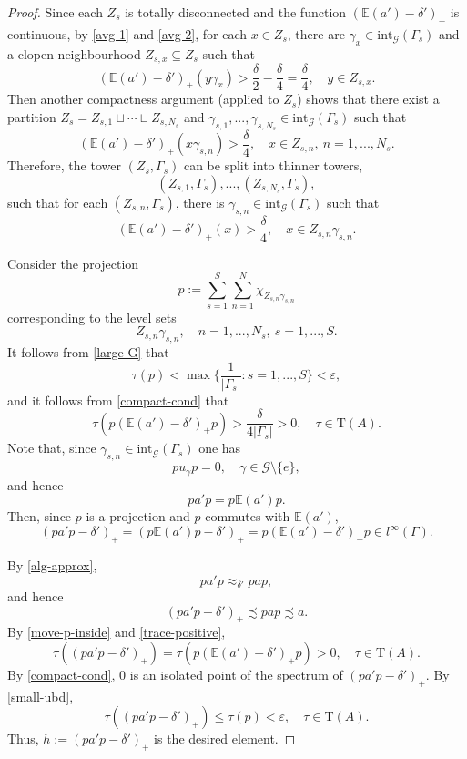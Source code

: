 \documentclass[12pt, oneside, psamsfonts]{amsart}
\theoremstyle{definition}
\theoremstyle{remark}
\numberwithin{equation}{section}
\newcommand{\abs}[1]{\left\vert#1\right\vert}
\newcommand{\eps}{\varepsilon}
\newcommand{\tr}{\mathrm{T}}
\begin{document}
\begin{proof}
Since each $Z_s$ is totally disconnected and the function $(\mathbb E(a') - \delta')_+$ is continuous, by \eqref{avg-1} and \eqref{avg-2}, for each $x \in Z_s$, there are $\gamma_x \in \mathrm{int}_{\mathcal G}(\Gamma_s)$ and a clopen neighbourhood $Z_{s, x} \subseteq Z_s$ such that 
$$(\mathbb E(a') - \delta')_+(y\gamma_{x}) > \frac{\delta}{2} - \frac{\delta}{4} =\frac{\delta}{4},\quad y \in Z_{s, x}.$$
Then another compactness argument (applied to $Z_s$) shows that there exist a partition $Z_s = Z_{s, 1} \sqcup \cdots \sqcup Z_{s, N_s}$ and $\gamma_{s, 1}, ..., \gamma_{s, N_s} \in \mathrm{int}_{\mathcal G}(\Gamma_s)$ such that 
$$(\mathbb E(a') - \delta')_+(x\gamma_{s, n}) > \frac{\delta}{4},\quad x \in Z_{s, n},\ n=1, ..., N_s.$$
Therefore, the tower $(Z_s, \Gamma_s)$ can be split into thinner towers, 
$$(Z_{s, 1}, \Gamma_s), ..., (Z_{s, N_s}, \Gamma_s), $$ 
such that for each $(Z_{s, n}, \Gamma_s)$, there is $\gamma_{s, n} \in \mathrm{int}_{\mathcal G}(\Gamma_s)$ such that 
\begin{equation}\label{compact-cond}
(\mathbb E(a') - \delta')_+(x) > \frac{\delta}{4}, \quad x\in Z_{s, n}\gamma_{s, n}. \end{equation} 

Consider the projection 
$$ p := \sum_{s=1}^S\sum_{n=1}^N \chi_{Z_{s, n}\gamma_{s, n}}$$ 
corresponding to the level sets $$Z_{s, n} \gamma_{s, n}, \quad n=1, ..., N_s, \ s = 1, ..., S.$$
It follows from \eqref{large-G} that
\begin{equation}\label{small-ubd}
\tau(p) < \max\{\frac{1}{\abs{\Gamma_s}}: s=1, ..., S \} <\eps,
\end{equation}
and it follows from \eqref{compact-cond} that 
\begin{equation}\label{trace-positive} 
\tau(p(\mathbb E(a') - \delta')_+p) > \frac{\delta}{4\abs{\Gamma_s}} > 0 ,\quad \tau \in \tr(A).
\end{equation}
Note that, since $\gamma_{s, n} \in \mathrm{int}_{\mathcal G}(\Gamma_s)$ one has
$$pu_\gamma p = 0,\quad \gamma \in \mathcal G\setminus\{e\},$$
and hence 
$$pa'p = p\mathbb E(a')p.$$
Then, since $p$ is a projection and $p$ commutes with $\mathbb E(a')$, 
\begin{equation}\label{move-p-inside}
 (pa'p - \delta')_+  = ( p\mathbb E(a') p - \delta')_+ = p( \mathbb E(a') - \delta')_+p \in l^\infty(\Gamma). 
\end{equation} 

By \eqref{alg-approx}, 
$$pa'p \approx_{\delta'} pap,$$
and hence 
$$(pa'p - {\delta'})_+ \precsim pap \precsim a.$$
By \eqref{move-p-inside} and \eqref{trace-positive}, 
$$ \tau((pa'p - \delta')_+)  =  \tau( p(\mathbb E(a') - \delta')_+p) >0, \quad \tau \in \tr(A).$$
By \eqref{compact-cond}, $0$ is an isolated point of the spectrum of $(pa'p - {\delta'})_+$. By \eqref{small-ubd}, $$\tau((pa'p - \delta')_+) \leq \tau(p) < \eps,\quad \tau \in \tr(A).$$
Thus, $h:= (pa'p - {\delta'})_+$ is the desired element.
\end{proof}
\end{document}

